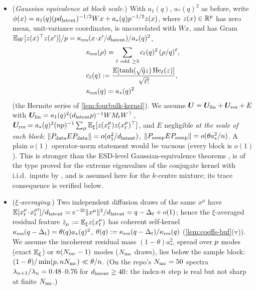 \begin{assumption}\label{assump:inputs-buf}
\begin{itemize}
\item[(H1)] (\emph{Gaussian equivalence at block scale.}) With $a_1(q)$, $a_*(q)^2$ as before, write $\phi(x)=a_1(q)(pd_{\mathrm{latent}})^{-1/2}Wx+a_*(q)p^{-1/2}z(x)$, where $z(x)\in\mathbb{R}^{p}$ has zero mean, unit-variance coordinates, is uncorrelated with $Wx$, and has Gram $\mathbb{E}_W[z(x)^\top z(x')]/p=\kappa_{\rm res}(x\!\cdot\!x'/d_{\mathrm{latent}})/a_*(q)^2$,
\begin{equation}\label{eq:kres-buf}
\begin{aligned}
&\kappa_{\rm res}(\rho)=\sum_{\ell\ {\rm odd}\ \ge3}c_\ell(q)^2\,(\rho/q)^\ell,\\ & c_\ell(q):=\frac{\E[\tanh(\sqrt qz)\,\mathrm{He}_\ell(z)]}{\sqrt{\ell!}},\\ &\kappa_{\rm res}(q)=a_*(q)^2
\end{aligned}
\end{equation}
(the Hermite series of \cref{lem:fourbulk-kernel}). We assume $\bm{U}=\bm{U}_{\rm lin}+\bm{U}_{\rm res}+E$ with $\bm{U}_{\rm lin}=a_1(q)^2(d_{\mathrm{latent}}p)^{-1}WM_tW^\top$, $\bm{U}_{\rm res}=a_*(q)^2(np)^{-1}\sum_\mu\mathbb{E}_\xi[z(x^\mu_t)z(x^\mu_t)^\top]$, and $E$ negligible \emph{at the scale of each block}: $\|P_{\rm data}EP_{\rm data}\|=o(a_1^2/d_{\mathrm{latent}})$, $\|P_{\rm samp}EP_{\rm samp}\|=o(\theta a_*^2/n)$. A plain $o(1)$ operator-norm statement would be vacuous (every block is $o(1)$). This is stronger than the ESD-level Gaussian-equivalence theorems \citep{goldt2022gaussian,hu2022universality,mei2022generalization}, is of the type proved for the extreme eigenvalues of the conjugate kernel with i.i.d.\ inputs by \citet{benigni2021eigenvalue}, and is assumed here for the $k$-centre mixture; its trace consequence is verified below.
\item[(H2)] (\emph{$\xi$-averaging.}) Two independent diffusion draws of the same $x^\mu$ have $\mathbb{E}[x^\mu_t\!\cdot\!x^{\mu\prime}_t]/d_{\mathrm{latent}}=e^{-2t}\|x^\mu\|^2/d_{\mathrm{latent}}=q-\Delta_t+o(1)$; hence the $\xi$-averaged residual feature $\bar z_\mu:=\mathbb{E}_\xi z(x^\mu_t)$ has coherent self-kernel $\kappa_{\rm res}(q-\Delta_t)=\theta(q)a_*(q)^2$, $\theta(q):=\kappa_{\rm res}(q-\Delta_t)/\kappa_{\rm res}(q)$ (\cref{lem:coeffs-buf}(v)). We assume the incoherent residual mass $(1-\theta)a_*^2$, spread over $p$ modes (exact $\mathbb{E}_\xi$) or $n(N_{\rm mc}-1)$ modes ($N_{\rm mc}$ draws), lies below the sample block: $(1-\theta)/\min(p,n N_{\rm mc})\ll\theta/n$. (On the repo's $N_{\rm mc}=50$ spectra $\lambda_{n+1}/\lambda_{n}=0.48$--$0.76$ for $d_{\mathrm{latent}}\ge40$: the index-$n$ step is real but not sharp at finite $N_{\rm mc}$.)

\end{itemize}
\end{assumption}
